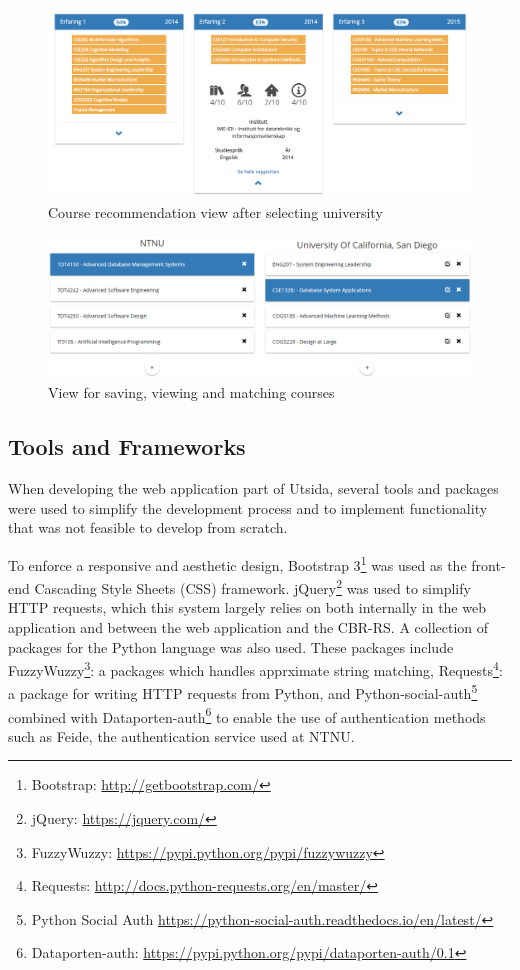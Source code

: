 \begin{figure}[h]
    \centering
    \includegraphics[width=1\textwidth]{fig/utsida_screenshots/result_2_cut_high.png}
    \caption[Course recommendation view]{Course recommendation view after selecting university}
    \label{fig:web_results_2}
\end{figure}

\begin{figure}[H]
    \centering
    \includegraphics[width=1\textwidth]{fig/utsida_screenshots/course_match_cut.png}
    \caption{View for saving, viewing and matching courses}
    \label{fig:web_courses}
\end{figure}

\subsection{Tools and Frameworks}

When developing the web application part of Utsida, several tools and packages were used to simplify the development process and to implement functionality that was not feasible to develop from scratch.

To enforce a responsive and aesthetic design, Bootstrap 3\footnote{Bootstrap: \url{http://getbootstrap.com/}} was used as the front-end Cascading Style Sheets (CSS) framework. jQuery\footnote{jQuery: \url{https://jquery.com/}} was used to simplify HTTP requests, which this system largely relies on both internally in the web application and between the web application and the CBR-RS. A collection of packages for the Python language was also used. These packages include FuzzyWuzzy\footnote{FuzzyWuzzy: \url{https://pypi.python.org/pypi/fuzzywuzzy}}: a packages which handles apprximate string matching, Requests\footnote{Requests: \url{http://docs.python-requests.org/en/master/}}: a package for writing HTTP requests from Python, and Python-social-auth\footnote{Python Social Auth \url{https://python-social-auth.readthedocs.io/en/latest/}} combined with Dataporten-auth\footnote{Dataporten-auth: \url{https://pypi.python.org/pypi/dataporten-auth/0.1}} to enable the use of authentication methods such as Feide, the authentication service used at NTNU.


